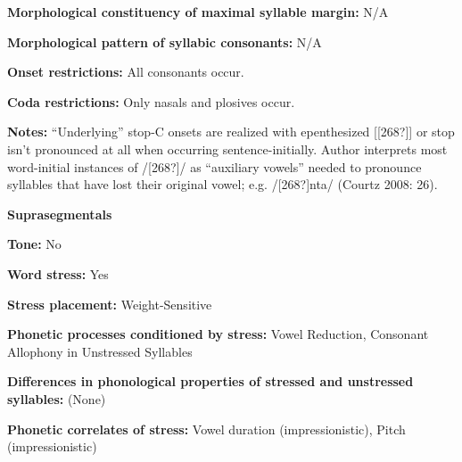 \begin{styleBody}
\textbf{Morphological constituency of maximal syllable margin:} N/A
\end{styleBody}

\begin{styleBody}
\textbf{Morphological pattern of syllabic consonants:} N/A
\end{styleBody}

\begin{styleBody}
\textbf{Onset restrictions: }All consonants occur.
\end{styleBody}

\begin{styleBody}
\textbf{Coda restrictions: }Only nasals and plosives occur.
\end{styleBody}

\begin{styleBody}
\textbf{Notes:} “Underlying” stop-C onsets are realized with epenthesized [[268?]] or stop isn’t pronounced at all when occurring sentence-initially. Author interprets most word-initial instances of /[268?]/ as “auxiliary vowels” needed to pronounce syllables that have lost their original vowel; e.g. /[268?]nta/ (Courtz 2008: 26).
\end{styleBody}

\begin{styleBody}
\textbf{Suprasegmentals}
\end{styleBody}

\begin{styleBody}
\textbf{Tone: }No
\end{styleBody}

\begin{styleBody}
\textbf{Word stress:} Yes
\end{styleBody}

\begin{styleBody}
\textbf{Stress placement:} Weight-Sensitive
\end{styleBody}

\begin{styleBody}
\textbf{Phonetic processes conditioned by stress:} Vowel Reduction, Consonant Allophony in Unstressed Syllables
\end{styleBody}

\begin{styleBody}
\textbf{Differences in phonological properties of stressed and unstressed syllables:} (None)
\end{styleBody}

\begin{styleBody}
\textbf{Phonetic correlates of stress: }Vowel duration (impressionistic), Pitch (impressionistic)
\end{styleBody}

